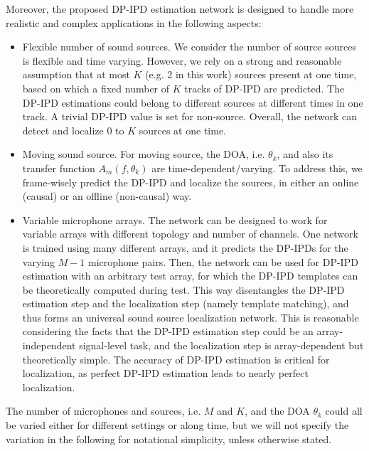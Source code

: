 \documentclass[lettersize,journal]{IEEEtran}
\begin{document}
Moreover, the proposed DP-IPD estimation network is designed to handle more realistic and complex applications in the following aspects: 

\begin{itemize} [leftmargin=*] 
\item Flexible number of sound sources. We consider the number of source sources is flexible and time varying. However, we rely on a strong and reasonable assumption that at most $K$ (e.g. 2 in this work) sources present at one time, based on which a fixed number of $K$ tracks of DP-IPD are predicted. The DP-IPD estimations could belong to different sources at different times in one track. A trivial DP-IPD value is set for non-source. Overall, the network can detect and localize 0 to $K$ sources at one time. 
\item Moving sound source. For moving source, the DOA, i.e. $\theta_k$, and also its transfer function $A_m\left(f, \theta_k\right)$ are time-dependent/varying. To address this, we frame-wisely predict the DP-IPD and localize the sources, in either an online (causal) or an offline (non-causal) way.
\item Variable microphone arrays. The network can be designed to work for variable arrays with different topology and number of channels. One network is trained using many different arrays, and it predicts the DP-IPDs for the varying $M-1$ microphone pairs. Then, the network can be used for DP-IPD estimation with an arbitrary test array, for which the DP-IPD templates can be theoretically computed during test. This way disentangles the DP-IPD estimation step and the localization step (namely template matching), and thus forms an universal sound source localization network. This is reasonable considering the facts that the DP-IPD estimation step could be an array-independent signal-level task, and the localization step is array-dependent but theoretically simple. The accuracy of DP-IPD estimation is critical for localization, as perfect DP-IPD estimation leads to nearly perfect localization.
\end{itemize}
The number of microphones and sources, i.e. $M$ and $K$, and the DOA $\theta_k$ could all be varied either for different settings or along time, but we will not specify the variation in the following for notational simplicity, unless otherwise stated.  
\end{document}
